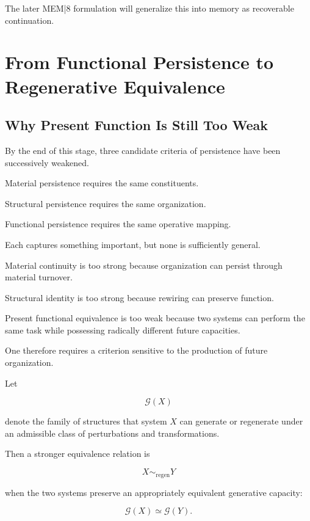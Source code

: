 \documentclass[11pt]{article}
\theoremstyle{remark}
\newcommand{\MEM}{\textsc{MEM|8}}
\begin{document}
The later \MEM{} formulation will generalize this into memory as recoverable continuation.

\section{From Functional Persistence to Regenerative Equivalence}

\subsection{Why Present Function Is Still Too Weak}

By the end of this stage, three candidate criteria of persistence have been successively weakened.

Material persistence requires the same constituents.

Structural persistence requires the same organization.

Functional persistence requires the same operative mapping.

Each captures something important, but none is sufficiently general.

Material continuity is too strong because organization can persist through material turnover.

Structural identity is too strong because rewiring can preserve function.

Present functional equivalence is too weak because two systems can perform the same task while possessing radically different future capacities.

One therefore requires a criterion sensitive to the production of future organization.

Let

\begin{equation}
\mathcal{G}(X)
\end{equation}

denote the family of structures that system $X$ can generate or regenerate under an admissible class of perturbations and transformations.

Then a stronger equivalence relation is

\begin{equation}
X\sim_{\mathrm{regen}}Y
\end{equation}

when the two systems preserve an appropriately equivalent generative capacity:

\begin{equation}
\mathcal{G}(X)
\simeq
\mathcal{G}(Y).
\end{equation}
\end{document}
